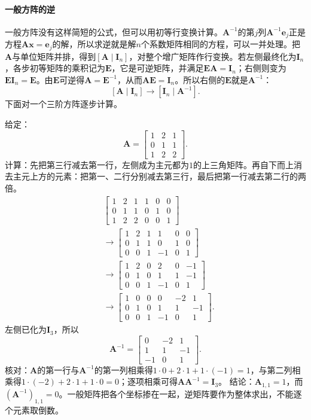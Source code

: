 \paragraph{一般方阵的逆}
一般方阵没有这样简短的公式，但可以用初等行变换计算。$\bm A^{-1}$的第$j$列$\bm A^{-1}\bm e_j$正是方程$\bm A\bm x=\bm e_j$的解，所以求逆就是解$n$个系数矩阵相同的方程，可以一并处理。把$\bm A$与单位矩阵并排，得到$[\bm A\mid\bm I_n]$，对整个增广矩阵作行变换。若左侧最终化为$\bm I_n$，各步初等矩阵的乘积记为$\bm E$，它是可逆矩阵，并满足$\bm E\bm A=\bm I_n$；右侧则变为$\bm E\bm I_n=\bm E$。由$\bm E$可逆得$\bm A=\bm E^{-1}$，从而$\bm A\bm E=\bm I_n$。所以右侧的$\bm E$就是$\bm A^{-1}$：
\[
 [\bm A\mid\bm I_n]\longrightarrow[\bm I_n\mid\bm A^{-1}].
\]
下面对一个三阶方阵逐步计算。
\begin{example}[用初等行变换求逆]
\label{ex:ls-inverse-by-solving}
给定：
\[
 \bm A=\begin{bmatrix}1&2&1\\0&1&1\\1&2&2\end{bmatrix}.
\]
计算：先把第三行减去第一行，左侧成为主元都为$1$的上三角矩阵。再自下而上消去主元上方的元素：把第一、二行分别减去第三行，最后把第一行减去第二行的两倍。
\[
 \begin{aligned}
 &\left[\begin{array}{ccc|ccc}1&2&1&1&0&0\\0&1&1&0&1&0\\1&2&2&0&0&1\end{array}\right]\\
 &\longrightarrow
 \left[\begin{array}{ccc|ccc}1&2&1&1&0&0\\0&1&1&0&1&0\\0&0&1&-1&0&1\end{array}\right]\\
 &\longrightarrow
 \left[\begin{array}{ccc|ccc}1&2&0&2&0&-1\\0&1&0&1&1&-1\\0&0&1&-1&0&1\end{array}\right]\\
 &\longrightarrow
 \left[\begin{array}{ccc|ccc}1&0&0&0&-2&1\\0&1&0&1&1&-1\\0&0&1&-1&0&1\end{array}\right].
 \end{aligned}
\]
左侧已化为$\bm I_3$，所以
\[
 \bm A^{-1}=\begin{bmatrix}0&-2&1\\1&1&-1\\-1&0&1\end{bmatrix}.
\]
核对：$\bm A$的第一行与$\bm A^{-1}$的第一列相乘得$1\cdot0+2\cdot1+1\cdot(-1)=1$，与第二列相乘得$1\cdot(-2)+2\cdot1+1\cdot0=0$；逐项相乘可得$\bm A\bm A^{-1}=\bm I_3$。
结论：$\bm A_{1,1}=1$，而$(\bm A^{-1})_{1,1}=0$。一般矩阵把各个坐标掺在一起，逆矩阵要作为整体求出，不能逐个元素取倒数。
\end{example}
